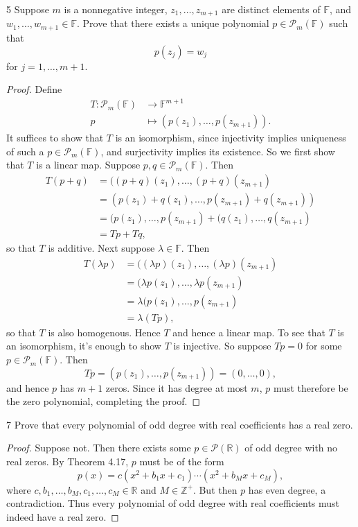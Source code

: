 \documentclass[11pt]{extarticle}
\newenvironment{problem}[1]{\begin{prob*}{#1}{}}{\end{prob*}}
\newcommand{\Z}{\mathbb{Z}}
\newcommand{\R}{\mathbb{R}}
\newcommand{\F}{\mathbb{F}}
\newcommand{\poly}{\mathcal{P}}
\begin{document}
\begin{problem}{5}
Suppose $m$ is a nonnegative integer, $z_1,\dots, z_{m+1}$ are distinct elements of $\F$, and $w_1,\dots, w_{m+1}\in\F$.  Prove that there exists a unique polynomial $p\in\poly_m(\F)$ such that 
\begin{equation*}
p(z_j) = w_j
\end{equation*}
for $j = 1,\dots,m+1$.  
\end{problem}
\begin{proof}
Define 
\begin{align*}
T:\poly_m(\F)&\to \F^{m + 1}\\
    p &\mapsto (p(z_1), \dots, p(z_{m+1})).
\end{align*}
It suffices to show that $T$ is an isomorphism, since injectivity implies uniqueness of such a $p\in\poly_m(\F)$, and surjectivity implies its existence.  So we first show that $T$ is a linear map.  Suppose $p,q\in\poly_m(\F)$.  Then
\begin{align*}
T(p + q) &= ((p + q)(z_1), \dots, (p + q)(z_{m+1})\\
&= (p(z_1) + q(z_1), \dots, p(z_{m+1}) + q(z_{m+1}))\\
&= (p(z_1), \dots, p(z_{m+1}) + (q(z_1), \dots, q(z_{m+1})\\
&= Tp + Tq,
\end{align*}
so that $T$ is additive.  Next suppose $\lambda\in\F$.  Then
\begin{align*}
T(\lambda p) &= ((\lambda p)(z_1), \dots, (\lambda p)(z_{m+1})\\
&= (\lambda p(z_1), \dots, \lambda p(z_{m+1})\\
&= \lambda (p(z_1), \dots, p(z_{m+1})\\
&= \lambda (Tp),
\end{align*}
so that $T$ is also homogenous.  Hence $T$ and hence a linear map.  To see that $T$ is an isomorphism, it's enough to show $T$ is injective.  So suppose $Tp = 0$ for some $p\in\poly_m(\F)$.  Then
\begin{equation*}
Tp = (p(z_1), \dots, p(z_{m+1})) = (0, \dots, 0),
\end{equation*}
and hence $p$ has $m + 1$ zeros.  Since it has degree at most $m$, $p$ must therefore be the zero polynomial, completing the proof.
\end{proof}

\begin{problem}{7}
Prove that every polynomial of odd degree with real coefficients has a real zero.
\end{problem}
\begin{proof}
Suppose not.  Then there exists some $p\in\poly(\R)$ of odd degree with no real zeros.  By Theorem 4.17, $p$ must be of the form
\begin{equation*}
p(x) = c(x^2 + b_1x + c_1)\cdots(x^2 + b_Mx + c_M),
\end{equation*}
where $c,b_1,\dots,b_M,c_1,\dots,c_M\in\R$ and $M\in\Z^+$.  But then $p$ has even degree, a contradiction.  Thus every polynomial of odd degree with real coefficients must indeed have a real zero.
\end{proof}
\end{document}

